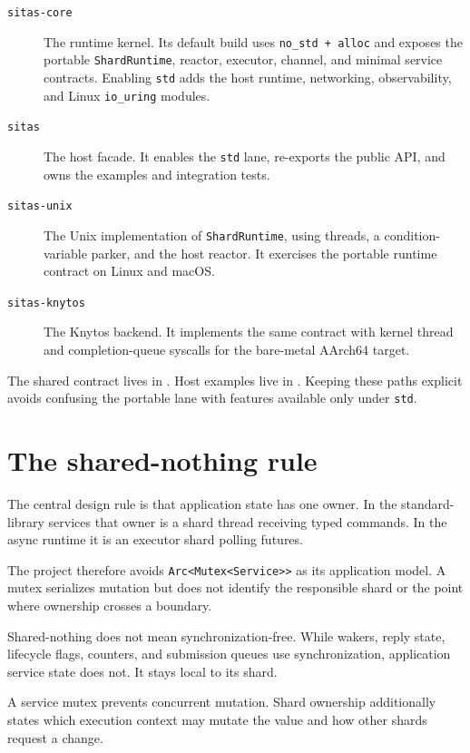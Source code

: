 \begin{description}
    \item[\texttt{sitas-core}] The runtime kernel. Its default build uses
        \texttt{no\_std + alloc} and exposes the portable
        \texttt{ShardRuntime}, reactor, executor, channel, and minimal service
        contracts. Enabling \texttt{std} adds the host runtime, networking,
        observability, and Linux \texttt{io\_uring} modules.
    \item[\texttt{sitas}] The host facade. It enables the \texttt{std} lane,
        re-exports the public API, and owns the examples and integration tests.
    \item[\texttt{sitas-unix}] The Unix implementation of
        \texttt{ShardRuntime}, using threads, a condition-variable parker, and
        the host reactor. It exercises the portable runtime contract on Linux
        and macOS.
    \item[\texttt{sitas-knytos}] The Knytos backend. It implements the
        same contract with kernel thread and completion-queue syscalls for the
        bare-metal AArch64 target.
\end{description}

The shared contract lives in . Host examples
live in . Keeping these paths explicit avoids
confusing the portable lane with features available only under \texttt{std}.

\section{The shared-nothing rule}

The central design rule is that application state has one owner. In the
standard-library services that owner is a shard thread receiving typed
commands. In the async runtime it is an executor shard polling futures.

The project therefore avoids
\texttt{Arc<Mutex<Service\textgreater{}\textgreater{}} as its application
model. A mutex serializes mutation but does not identify the responsible shard
or the point where ownership crosses a boundary.

Shared-nothing does not mean synchronization-free. While wakers, reply state,
lifecycle flags, counters, and submission queues use synchronization, application
service state does not. It stays local to its shard.

\begin{notabene}
A service mutex prevents concurrent mutation. Shard ownership additionally
states which execution context may mutate the value and how other shards
request a change.
\end{notabene}

